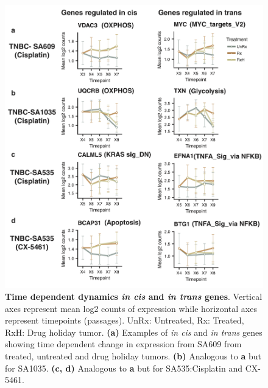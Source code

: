\begin{figure}
\centering
 \includegraphics{Figures/chap5/fig16_lineplotscistrans.png}
\caption[Examples of \textit{in cis} and \textit{in trans} genes]
	{\small
	 \textbf{Time dependent dynamics \textit{in cis} and \textit{in trans} genes}.
	 Vertical axes represent mean log2 counts of expression while horizontal axes represent timepoints (passages). UnRx: Untreated, Rx: Treated, RxH: Drug holiday tumor. \textbf{(a)} Examples of \textit{in cis} and \textit{in trans} genes showing time dependent change in expression from SA609 from treated, untreated and drug holiday tumors.  \textbf{(b)} Analogous to \textbf{a} but for SA1035. \textbf{(c, d)} Analogous to \textbf{a} but for SA535:Cisplatin and CX-5461.}

	\label{fig:cistrans}
\end{figure}


